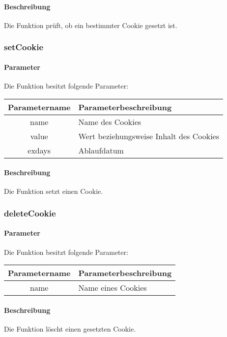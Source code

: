 \paragraph{Beschreibung} Die Funktion prüft, ob ein bestimmter Cookie gesetzt ist.
\subsubsection{setCookie}
\paragraph{Parameter} Die Funktion besitzt folgende Parameter:
\begin{table}[H]
	\begin{tabular}{|c|p{11cm}|}
		\hline
		\textbf{Parametername} & \textbf{Parameterbeschreibung} \\ \hline
		name   & Name des Cookies \\ \hline
		value  & Wert beziehungsweise Inhalt des Cookies \\ \hline
		exdays & Ablaufdatum \\ \hline
	\end{tabular}
\end{table}
\paragraph{Beschreibung} Die Funktion setzt einen Cookie.
\subsubsection{deleteCookie}
\paragraph{Parameter} Die Funktion besitzt folgende Parameter:
\begin{table}[H]
	\begin{tabular}{|c|p{11cm}|}
		\hline
		\textbf{Parametername} & \textbf{Parameterbeschreibung} \\ \hline
		name & Name eines Cookies \\ \hline
	\end{tabular}
\end{table}
\paragraph{Beschreibung} Die Funktion löscht einen gesetzten Cookie.
